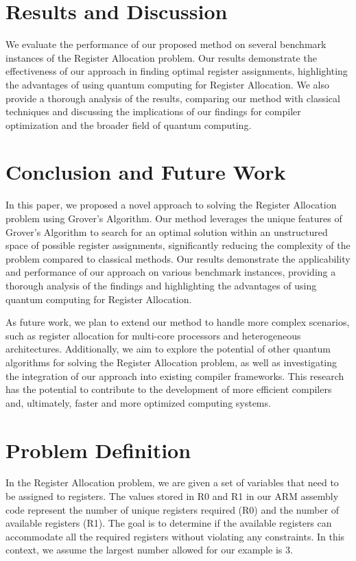 \section{Results and Discussion} \label{sec:results}

We evaluate the performance of our proposed method on several benchmark instances of the Register Allocation problem. Our results demonstrate the effectiveness of our approach in finding optimal register assignments, highlighting the advantages of using quantum computing for Register Allocation. We also provide a thorough analysis of the results, comparing our method with classical techniques and discussing the implications of our findings for compiler optimization and the broader field of quantum computing.

\section{Conclusion and Future Work} \label{sec:conclusion}

In this paper, we proposed a novel approach to solving the Register Allocation problem using Grover's Algorithm. Our method leverages the unique features of Grover's Algorithm to search for an optimal solution within an unstructured space of possible register assignments, significantly reducing the complexity of the problem compared to classical methods. Our results demonstrate the applicability and performance of our approach on various benchmark instances, providing a thorough analysis of the findings and highlighting the advantages of using quantum computing for Register Allocation.

As future work, we plan to extend our method to handle more complex scenarios, such as register allocation for multi-core processors and heterogeneous architectures. Additionally, we aim to explore the potential of other quantum algorithms for solving the Register Allocation problem, as well as investigating the integration of our approach into existing compiler frameworks. This research has the potential to contribute to the development of more efficient compilers and, ultimately, faster and more optimized computing systems.

\section{Problem Definition}

In the Register Allocation problem, we are given a set of variables that need to be assigned to registers. The values stored in R0 and R1 in our ARM assembly code represent the number of unique registers required (R0) and the number of available registers (R1). The goal is to determine if the available registers can accommodate all the required registers without violating any constraints. In this context, we assume the largest number allowed for our example is 3.


